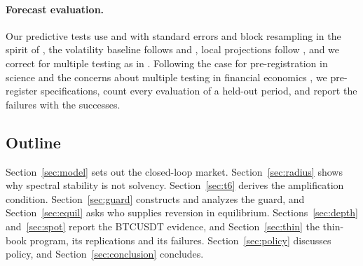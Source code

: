 \documentclass[12pt]{article}
\theoremstyle{definition}
\theoremstyle{remark}
\begin{document}
\paragraph{Forecast evaluation.} Our predictive tests use \citet{clark2007} and \citet{diebold1995} with \citet{newey1987} standard errors and block resampling in the spirit of \citet{kunsch1989}, the volatility baseline follows \citet{corsi2009} and \citet{riskmetrics1996}, local projections follow \citet{jorda2005}, and we correct for multiple testing as in \citet{holm1979}. Following the case for pre-registration in science \citep{nosek2018} and the concerns about multiple testing in financial economics \citep{harvey2016,harvey2017}, we pre-register specifications, count every evaluation of a held-out period, and report the failures with the successes.

\subsection{Outline}
Section~\ref{sec:model} sets out the closed-loop market. Section~\ref{sec:radius} shows why spectral stability is not solvency. Section~\ref{sec:t6} derives the amplification condition. Section~\ref{sec:guard} constructs and analyzes the guard, and Section~\ref{sec:equil} asks who supplies reversion in equilibrium. Sections~\ref{sec:depth} and~\ref{sec:spot} report the BTCUSDT evidence, and Section~\ref{sec:thin} the thin-book program, its replications and its failures. Section~\ref{sec:policy} discusses policy, and Section~\ref{sec:conclusion} concludes.
\end{document}
